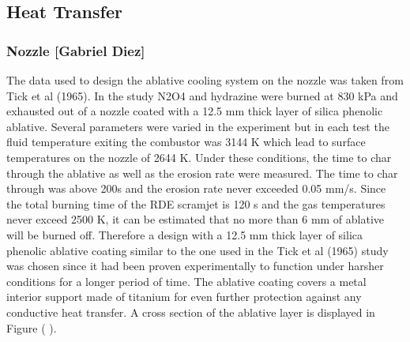 \subsection{Heat Transfer}


\subsubsection{Nozzle [Gabriel Diez]}

The data used to design the ablative cooling system on the nozzle was taken from Tick et al (1965). In the study N2O4 and hydrazine were burned at 830 kPa and exhausted out of a nozzle coated with a 12.5 mm thick layer of silica phenolic ablative. Several parameters were varied in the experiment but in each test the fluid temperature exiting the combustor was 3144 K which lead to surface temperatures on the nozzle of 2644 K. Under these conditions, the time to char through the ablative as well as the erosion rate were measured. The time to char through was above 200s and the erosion rate never exceeded 0.05 mm/s. Since the total burning time of the RDE scramjet is 120 s and the gas temperatures never exceed 2500 K, it can be estimated that no more than 6 mm of ablative will be burned off. Therefore a design with a 12.5 mm thick layer of silica phenolic ablative coating similar to the one used in the Tick et al (1965) study was chosen since it had been proven experimentally to function under harsher conditions for a longer period of time. The ablative coating covers a metal interior support made of titanium for even further protection against any conductive heat transfer. A cross section of the ablative layer is displayed in Figure ( ).


